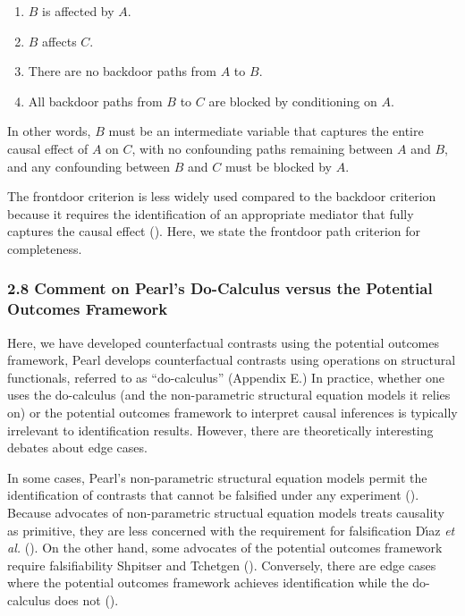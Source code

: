 \documentclass[
  single column]{article}
\providecommand{\tightlist}{%
  \setlength{\itemsep}{0pt}\setlength{\parskip}{0pt}}\usepackage{longtable,booktabs,array}
\begin{document}
\begin{enumerate}
\def\labelenumi{\arabic{enumi}.}
\tightlist
\item
  \(B\) is affected by \(A\).
\item
  \(B\) affects \(C\).
\item
  There are no backdoor paths from \(A\) to \(B\).
\item
  All backdoor paths from \(B\) to \(C\) are blocked by conditioning on
  \(A\).
\end{enumerate}

In other words, \(B\) must be an intermediate variable that captures the
entire causal effect of \(A\) on \(C\), with no confounding paths
remaining between \(A\) and \(B\), and any confounding between \(B\) and
\(C\) must be blocked by \(A\).

The frontdoor criterion is less widely used compared to the backdoor
criterion because it requires the identification of an appropriate
mediator that fully captures the causal effect
(). Here, we state the frontdoor
path criterion for completeness.

\subsubsection{2.8 Comment on Pearl's Do-Calculus versus the Potential
Outcomes
Framework}\label{comment-on-pearls-do-calculus-versus-the-potential-outcomes-framework}

Here, we have developed counterfactual contrasts using the potential
outcomes framework, Pearl develops counterfactual contrasts using
operations on structural functionals, referred to as ``do-calculus''
(Appendix E.) In practice, whether one uses the do-calculus (and the
non-parametric structural equation models it relies on) or the potential
outcomes framework to interpret causal inferences is typically
irrelevant to identification results. However, there are theoretically
interesting debates about edge cases.

In some cases, Pearl's non-parametric structural equation models permit
the identification of contrasts that cannot be falsified under any
experiment ().
Because advocates of non-parametric structual equation models treats
causality as primitive, they are less concerned with the requirement for
falsification Dı́az \emph{et al.} (). On the
other hand, some advocates of the potential outcomes framework require
falsifiability Shpitser and Tchetgen
(). Conversely, there are edge
cases where the potential outcomes framework achieves identification
while the do-calculus does not ().
\end{document}
